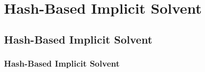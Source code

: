\chapter{Hash-Based Implicit Solvent}
\label{chapter:cell_solvent}
\section{Hash-Based Implicit Solvent}
\label{section:cell_solvent}
\subsection{Hash-Based Implicit Solvent}
\label{subsection:cell_solvent}
\cite{jacobson2004hierarchical}
